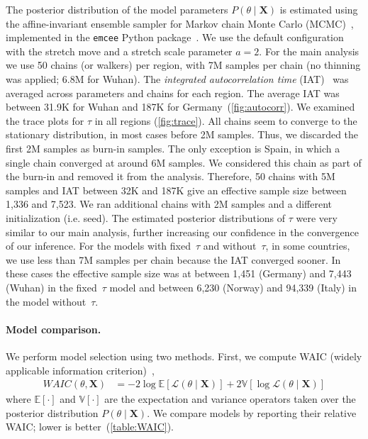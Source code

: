 \documentclass[12pt]{extarticle}
\let\vec\mathbf
\begin{document}
The posterior distribution of the model parameters $P(\theta \mid \vec{X})$ is estimated using the affine-invariant ensemble sampler for Markov chain Monte Carlo (MCMC)~\citep{Goodman2010}, implemented in the \texttt{emcee} Python package~\citep{Foreman-Mackey2013}.
We use the default configuration with the stretch move and a stretch scale parameter $a=2$.
For the main analysis we use 50 chains (or walkers) per region, with 7M samples per chain (no thinning was applied; 6.8M for Wuhan).
The \emph{integrated autocorrelation time} (IAT)~\citep{Foreman-Mackey2013,Goodman2010} was averaged across parameters and chains for each region. 
The average IAT was between 31.9K for Wuhan and 187K for Germany~(\autoref{fig:autocorr}).
We examined the trace plots for $\tau$ in all regions (\autoref{fig:trace}).
All chains seem to converge to the stationary distribution, in most cases before 2M samples. Thus, we discarded the first 2M samples as burn-in samples.
The only exception is Spain, in which a single chain converged at around 6M samples.
We considered this chain as part of the burn-in and removed it from the analysis.
Therefore, 50 chains with 5M samples and IAT between 32K and 187K give an effective sample size between 1,336 and 7,523.
We ran additional chains with 2M samples and a different initialization (i.e. seed). The estimated posterior distributions of $\tau$ were very similar to our main analysis, further increasing our confidence in the convergence of our inference.
For the models with fixed~$\tau$ and without~$\tau$, in some countries, we use less than 7M samples per chain because the IAT converged sooner.
In these cases the effective sample size was at between 1,451 (Germany) and 7,443 (Wuhan) in the fixed~$\tau$ model and between 6,230 (Norway) and 94,339 (Italy) in the model without~$\tau$.



\paragraph*{Model comparison.}
We perform model selection using two methods.
First, we compute WAIC (widely applicable information criterion)~\citep{gelman2013bayesian},
\begin{equation} \label{eq:WAIC}
\begin{aligned}
\mathit{WAIC}(\theta, \vec{X}) &= -2\log\mathbb{E}[\mathcal{L}(\theta \mid \vec{X})] + 2\mathbb{V}[\log\mathcal{L}(\theta \mid \vec{X})]
\end{aligned}
\end{equation}
where $\mathbb{E}[\cdot]$ and $\mathbb{V}[\cdot]$ are the expectation and variance operators taken over the posterior distribution $P(\theta \mid \vec{X})$.
We compare models by reporting their relative WAIC; lower is better~(\autoref{table:WAIC}).
\end{document}
